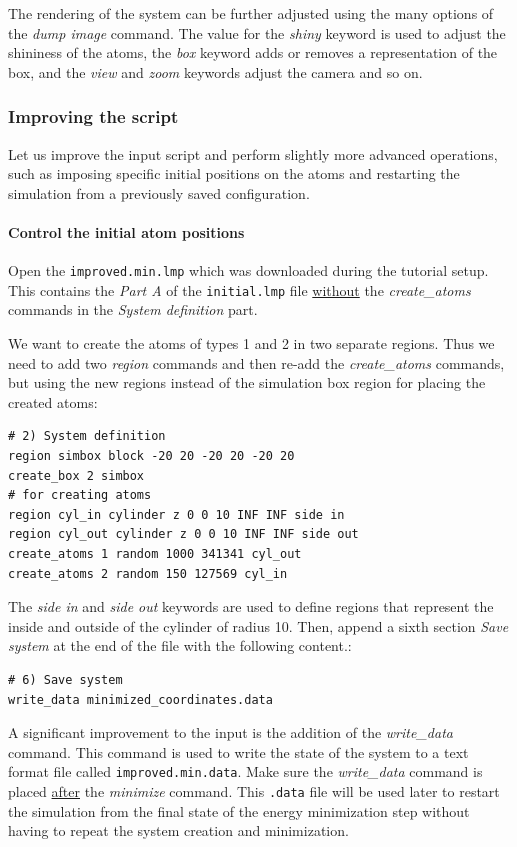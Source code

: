 \documentclass[9pt,tutorial]{livecoms}
\renewcommand{\emph}[1]{\underline{#1}} %
\newcommand{\flecmd}[1]{\textcolor{command}{\texttt{#1}}} %
\begin{document}
The rendering of the system can be further adjusted using the many
options of the \textit{dump image} command.  The value for the
\textit{shiny} keyword is used to adjust the shininess of the atoms, the
\textit{box} keyword adds or removes a representation of the box, and
the \textit{view} and \textit{zoom} keywords adjust the camera and so
on.

\subsubsection{Improving the script}

Let us improve the input script and perform slightly more advanced operations,
such as imposing specific initial positions on the atoms and restarting the
simulation from a previously saved configuration.

\paragraph{Control the initial atom positions}
Open the \flecmd{improved.min.lmp} which was downloaded during the
tutorial setup.  This contains the \textit{Part A} of the
\flecmd{initial.lmp} file \emph{without} the \textit{create\_atoms}
commands in the \textit{System definition} part.

We want to create the atoms of types 1 and 2 in two separate
regions.  Thus we need to add two \textit{region} commands and then
re-add the \textit{create\_atoms} commands, but using the new regions
instead of the simulation box region for placing the created atoms:
\begin{lstlisting}
# 2) System definition
region simbox block -20 20 -20 20 -20 20
create_box 2 simbox
# for creating atoms
region cyl_in cylinder z 0 0 10 INF INF side in
region cyl_out cylinder z 0 0 10 INF INF side out
create_atoms 1 random 1000 341341 cyl_out
create_atoms 2 random 150 127569 cyl_in
\end{lstlisting}
The \textit{side in} and \textit{side out} keywords are used to define
regions that represent the inside and outside of the cylinder of radius
10. Then, append a sixth section \textit{Save system} at the end of the
file with the following content.:
\begin{lstlisting}
# 6) Save system
write_data minimized_coordinates.data
\end{lstlisting}

A significant improvement to the input is the addition of the
\textit{write\_data} command.  This command is used to write the state
of the system to a text format file called \flecmd{improved.min.data}.
Make sure the \textit{write\_data} command is placed \emph{after} the
\textit{minimize} command.  This \flecmd{.data} file will be used later
to restart the simulation from the final state of the energy
minimization step without having to repeat the system creation and
minimization.
\end{document}
